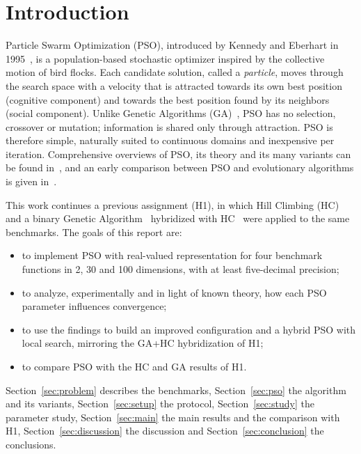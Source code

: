 \documentclass[conference]{IEEEtran}
\begin{document}
\section{Introduction}
Particle Swarm Optimization (PSO), introduced by Kennedy and Eberhart in
1995~\cite{kennedy1995,eberhart1995}, is a population-based stochastic
optimizer inspired by the collective motion of bird flocks. Each candidate
solution, called a \emph{particle}, moves through the search space with a
velocity that is attracted towards its own best position (cognitive
component) and towards the best position found by its neighbors (social
component). Unlike Genetic Algorithms (GA)~\cite{holland1975,goldberg1989},
PSO has no selection, crossover or mutation; information is shared only
through attraction. PSO is therefore simple, naturally suited to
continuous domains and inexpensive per iteration. Comprehensive overviews
of PSO, its theory and its many variants can be found
in~\cite{kennedy2001,poli2007,engelbrecht2007,bonyadi2017}, and an early
comparison between PSO and evolutionary algorithms is given
in~\cite{angeline1998}.

This work continues a previous assignment (H1), in which Hill Climbing (HC)
and a binary Genetic Algorithm~\cite{michalewicz1996} hybridized with
HC~\cite{talbi2002} were applied to the same benchmarks. The goals of this
report are:
\begin{itemize}
\item to implement PSO with real-valued representation for four benchmark
functions in 2, 30 and 100 dimensions, with at least five-decimal
precision;
\item to analyze, experimentally and in light of known theory, how each
PSO parameter influences convergence;
\item to use the findings to build an improved configuration and a hybrid
PSO with local search, mirroring the GA+HC hybridization of H1;
\item to compare PSO with the HC and GA results of H1.
\end{itemize}

Section~\ref{sec:problem} describes the benchmarks, Section~\ref{sec:pso}
the algorithm and its variants, Section~\ref{sec:setup} the protocol,
Section~\ref{sec:study} the parameter study, Section~\ref{sec:main} the
main results and the comparison with H1, Section~\ref{sec:discussion} the
discussion and Section~\ref{sec:conclusion} the conclusions.
\end{document}
